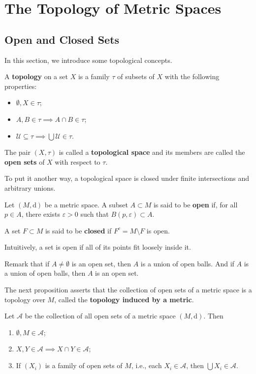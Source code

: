 \chapter{The Topology of Metric Spaces}

\section{Open and Closed Sets}

In this section, we introduce some topological concepts.

\begin{definition}[Topology]
    A \textbf{topology} on a set $X$ is a family $\tau$ of subsets of $X$ with the following properties:
    \begin{itemize}
        \item $\emptyset, X \in \tau$;
        \item $A, B \in \tau \implies A \cap B \in \tau$;
        \item $\mathcal{U} \subseteq \tau \implies \bigcup \mathcal{U} \in \tau$.
    \end{itemize}

    The pair $(X, \tau)$ is called a \textbf{topological space} and its members are called the \textbf{open sets} of $X$ with respect to $\tau$.
\end{definition}

To put it another way, a topological space is closed under finite intersections and arbitrary unions.

\begin{definition}
    Let $(M, \mathrm{d})$ be a metric space. A subset $A \subset M$ is said to be \textbf{open} if, for all $p \in A$, there exists $\varepsilon > 0$ such that $B(p, \varepsilon) \subset A$.

    A set $F \subset M$ is said to be \textbf{closed} if $F^c = M \setminus F$ is open.
\end{definition}

Intuitively, a set is open if all of its points fit loosely inside it.

Remark that if $A \neq \emptyset$ is an open set, then $A$ is a union of open balls. And if $A$ is a union of open balls, then $A$ is an open set.

The next proposition asserts that the collection of open sets of a metric space is a topology over $M$, called the \textbf{topology induced by a metric}.

\begin{proposition}\label{prop:opens-topology}
    Let $\mathcal{A}$ be the collection of all open sets of a metric space $(M, \mathrm{d})$. Then
    \begin{enumerate}
        \item $\emptyset, M \in \mathcal{A}$;
        \item $X, Y \in \mathcal{A} \implies X \cap Y \in \mathcal{A}$;
        \item If $(X_i)$ is a family of open sets of $M$, i.e., each $X_i \in \mathcal{A}$, then $\bigcup X_i \in \mathcal{A}$.
    \end{enumerate}
\end{proposition}


